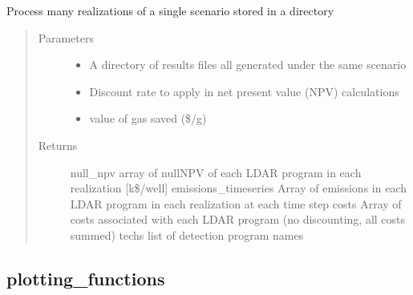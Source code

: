 \documentclass[letterpaper,10pt,english]{sphinxmanual}
\begin{document}
\begin{fulllineitems}
\label{\detokenize{index:feast.ResultsProcessing.results_analysis_functions.results_analysis}}
Process many realizations of a single scenario stored in a directory
\begin{quote}\begin{description}
\item[{Parameters}] \leavevmode\begin{itemize}
\item {} 
 \textendash{} A directory of results files all generated under the same scenario

\item {} 
 \textendash{} Discount rate to apply in net present value (NPV) calculations

\item {} 
 \textendash{} value of gas saved (\$/g)

\end{itemize}

\item[{Returns}] \leavevmode
null\_npv          array of null\sphinxhyphen{}NPV of each LDAR program in each realization {[}k\$/well{]}
emissions\_timeseries  Array of emissions in each LDAR program in each realization at each time step
costs                 Array of costs associated with each LDAR program (no discounting, all costs summed)
techs           list of detection program names

\end{description}\end{quote}

\end{fulllineitems}



\subsection{plotting\_functions}
\label{\detokenize{index:module-feast.ResultsProcessing.plotting_functions}}\label{\detokenize{index:plotting-functions}}
\end{document}
